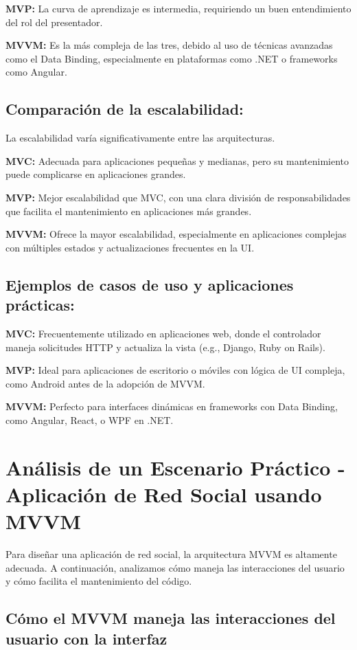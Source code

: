 \documentclass[letterpaper, 12pt]{report}
\begin{document}
\textbf{MVP:} La curva de aprendizaje es intermedia, requiriendo un buen entendimiento del rol del presentador.

\textbf{MVVM:} Es la más compleja de las tres, debido al uso de técnicas avanzadas como el Data Binding, especialmente en plataformas como .NET o frameworks como Angular.

\subsection{Comparación de la escalabilidad:}

La escalabilidad varía significativamente entre las arquitecturas.

\textbf{MVC:} Adecuada para aplicaciones pequeñas y medianas, pero su mantenimiento puede complicarse en aplicaciones grandes.

\textbf{MVP:} Mejor escalabilidad que MVC, con una clara división de responsabilidades que facilita el mantenimiento en aplicaciones más grandes.

\textbf{MVVM:} Ofrece la mayor escalabilidad, especialmente en aplicaciones complejas con múltiples estados y actualizaciones frecuentes en la UI.

\subsection{Ejemplos de casos de uso y aplicaciones prácticas:}

\textbf{MVC:} Frecuentemente utilizado en aplicaciones web, donde el controlador maneja solicitudes HTTP y actualiza la vista (e.g., Django, Ruby on Rails).

\textbf{MVP:} Ideal para aplicaciones de escritorio o móviles con lógica de UI compleja, como Android antes de la adopción de MVVM.

\textbf{MVVM:} Perfecto para interfaces dinámicas en frameworks con Data Binding, como Angular, React, o WPF en .NET.

\section{Análisis de un Escenario Práctico - Aplicación de Red Social usando MVVM}

Para diseñar una aplicación de red social, la arquitectura MVVM es altamente adecuada. A continuación, analizamos cómo maneja las interacciones del usuario y cómo facilita el mantenimiento del código.

\subsection{Cómo el MVVM maneja las interacciones del usuario con la interfaz}
\end{document}
